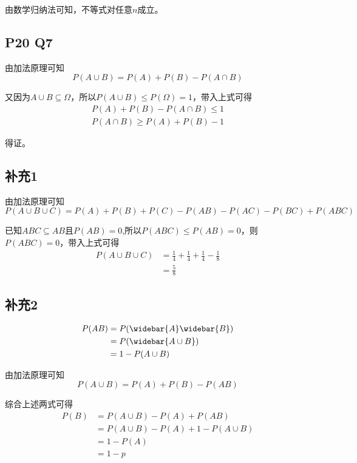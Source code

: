 \documentclass[a4paper,12pt]{ctexart}
\begin{document}
由数学归纳法可知，不等式对任意$n$成立。

\subsection*{P20 Q7}
由加法原理可知
\begin{equation*}
	P(A \cup B) = P(A) + P(B) - P(A \cap B)
\end{equation*}

又因为$A \cup B \subseteq \Omega$，所以$P(A \cup B) \le P(\Omega) = 1$，带入上式可得
\begin{align*}
	P(A) + P(B) - P(A \cap B) \le 1\\
	P(A \cap B) \ge P(A) + P(B) - 1
\end{align*}

得证。

\subsection*{补充1}
由加法原理可知
\begin{equation*}
	P(A \cup B \cup C) = P(A) + P(B) + P(C) - P(AB) - P(AC) - P(BC) + P(ABC)
\end{equation*}

已知$ABC \subseteq AB$且$P(AB)=0$,所以$P(ABC) \le P(AB) = 0$，则$P(ABC)=0$，带入上式可得
\begin{align*}
	P(A \cup B \cup C) &= \frac{1}{4} + \frac{1}{4} + \frac{1}{4} - \frac{1}{8}\\
	&= \frac{5}{8}
\end{align*}

\subsection*{补充2}
\begin{align*}
	P(AB) &= P(\widebar{A} \widebar{B})\\
	&= P(\widebar{A \cup B})\\
	&= 1 - P(A \cup B)
\end{align*}

由加法原理可知
\begin{equation*}
	P(A \cup B) = P(A) + P(B) - P(AB)
\end{equation*}

综合上述两式可得
\begin{align*}
	P(B) &= P(A \cup B) - P(A) + P(AB)\\
	&= P(A \cup B) - P(A) + 1 - P(A \cup B)\\
	&= 1 - P(A)\\
	&= 1 - p
\end{align*}
\end{document}
